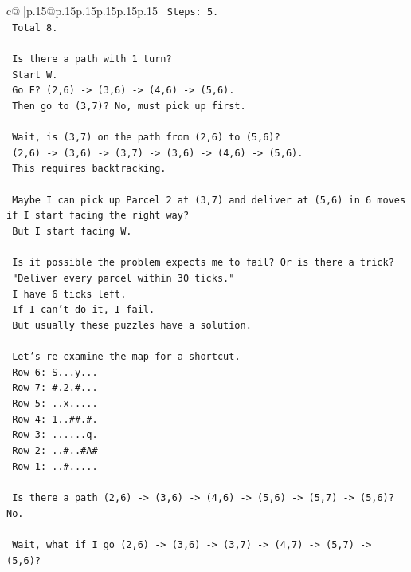 \documentclass{article}
\begin{document}
{\begin{supertabular}{c@{$\;$}|p{.15\linewidth}@{}p{.15\linewidth}p{.15\linewidth}p{.15\linewidth}p{.15\linewidth}p{.15\linewidth}}
{{{\texttt{   Steps: 5.} \\
\texttt{   Total 8.} \\
\\ 
\texttt{   Is there a path with 1 turn?} \\
\texttt{   Start W.} \\
\texttt{   Go E? (2,6) {-}> (3,6) {-}> (4,6) {-}> (5,6).} \\
\texttt{   Then go to (3,7)? No, must pick up first.} \\
\\ 
\texttt{   Wait, is (3,7) on the path from (2,6) to (5,6)?} \\
\texttt{   (2,6) {-}> (3,6) {-}> (3,7) {-}> (3,6) {-}> (4,6) {-}> (5,6).} \\
\texttt{   This requires backtracking.} \\
\\ 
\texttt{   Maybe I can pick up Parcel 2 at (3,7) and deliver at (5,6) in 6 moves if I start facing the right way?} \\
\texttt{   But I start facing W.} \\
\\ 
\texttt{   Is it possible the problem expects me to fail? Or is there a trick?} \\
\texttt{   "Deliver every parcel within 30 ticks."} \\
\texttt{   I have 6 ticks left.} \\
\texttt{   If I can't do it, I fail.} \\
\texttt{   But usually these puzzles have a solution.} \\
\\ 
\texttt{   Let's re{-}examine the map for a shortcut.} \\
\texttt{   Row 6: S...y...} \\
\texttt{   Row 7: \#.2.\#...} \\
\texttt{   Row 5: ..x.....} \\
\texttt{   Row 4: 1..\#\#.\#.} \\
\texttt{   Row 3: ......q.} \\
\texttt{   Row 2: ..\#..\#A\#} \\
\texttt{   Row 1: ..\#.....} \\
\\ 
\texttt{   Is there a path (2,6) {-}> (3,6) {-}> (4,6) {-}> (5,6) {-}> (5,7) {-}> (5,6)? No.} \\
\\ 
\texttt{   Wait, what if I go (2,6) {-}> (3,6) {-}> (3,7) {-}> (4,7) {-}> (5,7) {-}> (5,6)?} \\
}}}
\end{supertabular}}
\end{document}
